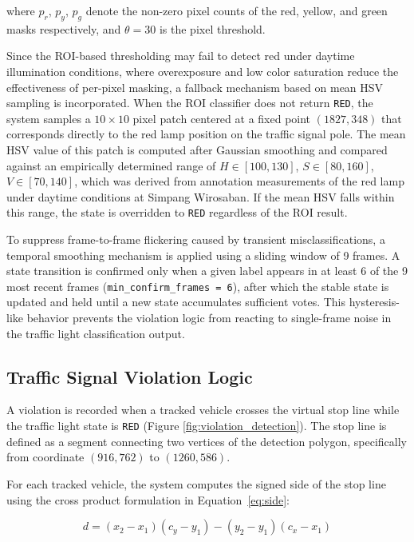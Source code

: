 \noindent where $p_r$, $p_y$, $p_g$ denote the non-zero pixel counts of the red, yellow, and green masks respectively, and $\theta = 30$ is the pixel threshold.

Since the ROI-based thresholding may fail to detect red under daytime illumination conditions, where overexposure and low color saturation reduce the effectiveness of per-pixel masking, a fallback mechanism based on mean HSV sampling is incorporated. When the ROI classifier does not return \texttt{RED}, the system samples a $10 \times 10$ pixel patch centered at a fixed point $(1827, 348)$ that corresponds directly to the red lamp position on the traffic signal pole. The mean HSV value of this patch is computed after Gaussian smoothing and compared against an empirically determined range of $H \in [100, 130]$, $S \in [80, 160]$, $V \in [70, 140]$, which was derived from annotation measurements of the red lamp under daytime conditions at Simpang Wirosaban. If the mean HSV falls within this range, the state is overridden to \texttt{RED} regardless of the ROI result.

To suppress frame-to-frame flickering caused by transient misclassifications, a temporal smoothing mechanism is applied using a sliding window of 9 frames. A state transition is confirmed only when a given label appears in at least 6 of the 9 most recent frames (\texttt{min\_confirm\_frames = 6}), after which the stable state is updated and held until a new state accumulates sufficient votes. This hysteresis-like behavior prevents the violation logic from reacting to single-frame noise in the traffic light classification output.

\subsection{Traffic Signal Violation Logic}
A violation is recorded when a tracked vehicle crosses the virtual stop line while the traffic light state is \texttt{RED} (Figure \ref{fig:violation_detection}). The stop line is defined as a segment connecting two vertices of the detection polygon, specifically from coordinate $(916, 762)$ to $(1260, 586)$.

For each tracked vehicle, the system computes the signed side of the stop line using the cross product formulation in Equation~\ref{eq:side}:

\figViolationDetection

\begin{equation}
d = (x_2 - x_1)(c_y - y_1) - (y_2 - y_1)(c_x - x_1)
\label{eq:side}
\end{equation}

